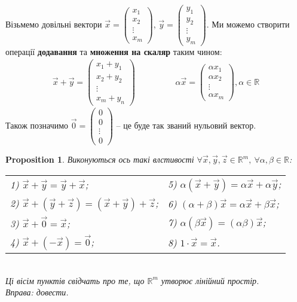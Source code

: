 \documentclass[a4paper, 10pt]{article}
\theoremstyle{theoremdd}
\theoremstyle{theoremdd}
\theoremstyle{theoremdd}
\theoremstyle{theoremdd}
\theoremstyle{theoremdd}
\theoremstyle{theoremdd}
\newtheorem{proposition}[theorem]{Proposition}
\theoremstyle{theoremdd}
\theoremstyle{theoremdd}
\theoremstyle{theoremdd}
\begin{document}
Візьмемо довільні вектори $\vec{x} = \begin{pmatrix}
x_1 \\ x_2 \\ \vdots \\ x_m
\end{pmatrix}$, $\vec{y} = \begin{pmatrix}
y_1 \\ y_2 \\ \vdots \\ y_m
\end{pmatrix}$. Ми можемо створити операції \textbf{додавання} та \textbf{множення на скаляр} таким чином:
\begin{align*}
\vec{x} + \vec{y} = \begin{pmatrix}
x_1 + y_1 \\ x_2 + y_2 \\ \vdots \\ x_m + y_n
\end{pmatrix} \hspace{2cm} \alpha \vec{x} = \begin{pmatrix}
\alpha x_1 \\ \alpha x_2 \\ \vdots \\ \alpha x_m
\end{pmatrix}, \alpha \in \mathbb{R}
\end{align*}
Також позначимо $\vec{0} = \begin{pmatrix}
0 \\ 0 \\ \vdots \\ 0
\end{pmatrix}$ -- це буде так званий нульовий вектор.
\begin{proposition}
Виконуються ось такі влстивості $\forall \vec{x},\vec{y},\vec{z} \in \mathbb{R}^m,\ \forall \alpha,\beta \in \mathbb{R}$:\\
\begin{tabular}{ll}
1) $\vec{x} + \vec{y} = \vec{y} + \vec{x}$; & 5) $\alpha (\vec{x} + \vec{y}) = \alpha \vec{x} + \alpha \vec{y}$; \\
2) $\vec{x} + (\vec{y} + \vec{z}) = (\vec{x} + \vec{y}) + \vec{z}$; & 6) $(\alpha + \beta) \vec{x} = \alpha \vec{x} + \beta \vec{x}$; \\
3) $\vec{x} + \vec{0} = \vec{x}$; & 7) $\alpha (\beta \vec{x}) = (\alpha \beta) \vec{x}$; \\
4) $\vec{x} + (-\vec{x}) = \vec{0}$; & 8) $1 \cdot \vec{x} = \vec{x}$.
\end{tabular}\\
Ці вісім пунктів свідчать про те, що $\mathbb{R}^m$ утворює лінійний простір.\\
\textit{Вправа: довести.}
\end{proposition}
\end{document}
